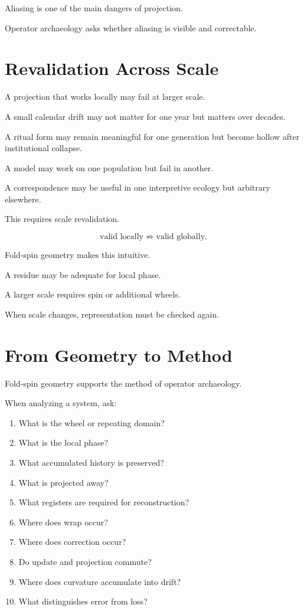 \documentclass[11pt]{book}
\begin{document}
Aliasing is one of the main dangers of projection.

Operator archaeology asks whether aliasing is visible and correctable.

\section{Revalidation Across Scale}

A projection that works locally may fail at larger scale.

A small calendar drift may not matter for one year but matters over decades.

A ritual form may remain meaningful for one generation but become hollow after institutional collapse.

A model may work on one population but fail in another.

A correspondence may be useful in one interpretive ecology but arbitrary elsewhere.

This requires scale revalidation.

\[
\text{valid locally} \not\Rightarrow \text{valid globally}.
\]

Fold-spin geometry makes this intuitive.

A residue may be adequate for local phase.

A larger scale requires spin or additional wheels.

When scale changes, representation must be checked again.

\section{From Geometry to Method}

Fold-spin geometry supports the method of operator archaeology.

When analyzing a system, ask:

\begin{enumerate}[label=\arabic*.]
    \item What is the wheel or repeating domain?
    \item What is the local phase?
    \item What accumulated history is preserved?
    \item What is projected away?
    \item What registers are required for reconstruction?
    \item Where does wrap occur?
    \item Where does correction occur?
    \item Do update and projection commute?
    \item Where does curvature accumulate into drift?
    \item What distinguishes error from loss?
\end{enumerate}
\end{document}
